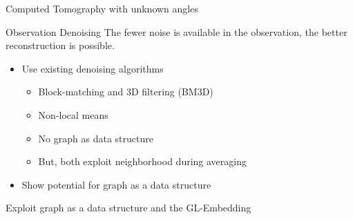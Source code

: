 \begin{frame}{Computed Tomography with unknown angles}
\end{frame}





\begin{frame}{Observation Denoising}
  The fewer noise is available in the observation, the better reconstruction is possible.
  
  \pause
  \begin{itemize}
    \item Use existing denoising algorithms
    \begin{itemize}
      \item Block-matching and 3D filtering (BM3D) \cite{bm3d}
      \item Non-local means \cite{noneLocalMean}
      \item No graph as data structure
      \item But, both exploit neighborhood during averaging
    \end{itemize}
    \item<3-> \alert<3->{Show potential for graph as a data structure}
  \end{itemize}

  \begin{tcolorbox}[colback=red!5!white,hide=<1-3>, alert=<4>, colframe=red!75!black]
    Exploit graph as a data structure and the GL-Embedding
\end{tcolorbox}

  
\end{frame}
